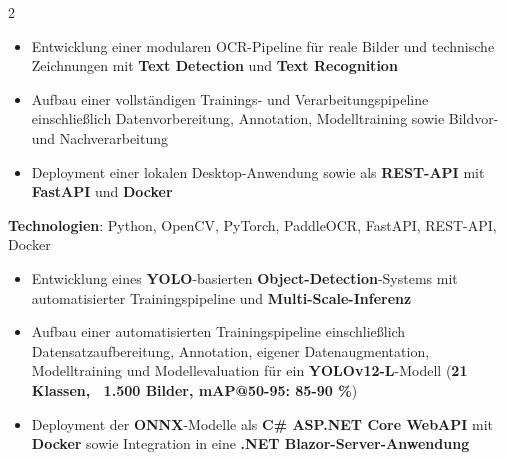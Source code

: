 \documentclass[10pt,a4paper,withhyper]{altacv}
\begin{document}
\begin{paracol}{2}
  \medskip

  \newpage

  \switchcolumn


  \vspace{1em}


  \vspace{0.5em}

  \begin{itemize}
    \item Entwicklung einer modularen OCR-Pipeline für reale Bilder und technische Zeichnungen mit \textbf{Text Detection} und \textbf{Text Recognition}
    \item Aufbau einer vollständigen Trainings- und Verarbeitungspipeline einschließlich Datenvorbereitung, Annotation, Modelltraining sowie Bildvor- und Nachverarbeitung
    \item Deployment einer lokalen Desktop-Anwendung sowie als \textbf{REST-API} mit \textbf{FastAPI} und \textbf{Docker}
  \end{itemize}

  \vspace{0.5em}

  \textbf{Technologien}: Python, OpenCV, PyTorch, PaddleOCR, FastAPI, REST-API, Docker

  \vspace{0.5em}


  \vspace{0.5em}

  \begin{itemize}
    \item Entwicklung eines \textbf{YOLO}-basierten \textbf{Object-Detection}-Systems mit automatisierter Trainingspipeline und \textbf{Multi-Scale-Inferenz}
    \item Aufbau einer automatisierten Trainingspipeline einschließlich Datensatzaufbereitung, Annotation, eigener Datenaugmentation, Modelltraining und Modellevaluation für ein \textbf{YOLOv12-L}-Modell (\textbf{21 Klassen, ~1.500 Bilder, mAP@50-95: 85-90 \%})
    \item Deployment der \textbf{ONNX}-Modelle als \textbf{C\# ASP.NET Core WebAPI} mit \textbf{Docker} sowie Integration in eine \textbf{.NET Blazor-Server-Anwendung}
  \end{itemize}


\end{paracol}
\end{document}
